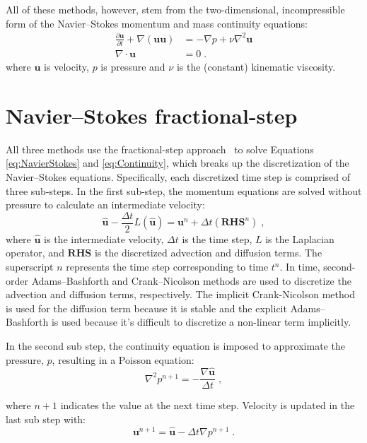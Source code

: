 All of these methods, however, stem from the two-dimensional, incompressible form of the Navier--Stokes momentum and mass continuity equations:
\begin{align}
\frac{\partial \textbf{u}}{\partial t} + \nabla ( \textbf{uu} ) &= -\nabla p + \nu\nabla^{2}\textbf{u} \label{eq:NavierStokes} \\
\nabla \cdot \textbf{u} &= 0 \label{eq:Continuity} \;.
\end{align}
where $\textbf{u}$ is velocity, $p$ is pressure and $\nu$ is the (constant) kinematic viscosity.

\section{Navier--Stokes fractional-step}\label{NM:NavierStokes}
All three methods use the fractional-step approach~\cite{Perot1993} to solve Equations \eqref{eq:NavierStokes} and \eqref{eq:Continuity}, which breaks up the discretization of the Navier--Stokes equations. 
Specifically, each discretized time step is comprised of three sub-steps.
In the first sub-step, the momentum equations are solved without pressure to  calculate an intermediate velocity:
\begin{equation}\label{eq:Intermediate Velocity}
\hat{\textbf{u}} - \frac{\Delta t}{2}L(\hat{\textbf{u}}) = \textbf{u}^n + \Delta t(\textbf{RHS}^n) \;,
\end{equation}
where $\hat{\textbf{u}}$ is the intermediate velocity, $\Delta t$ is the time step, $L$ is the Laplacian operator, and $\textbf{RHS}$ is the discretized advection and diffusion terms. 
The superscript $n$ represents the time step corresponding to time $t^n$. 
In time, second-order Adams--Bashforth and Crank--Nicolson methods are used to discretize the advection and diffusion terms, respectively. 
The implicit Crank-Nicolson method is used for the diffusion term because it is stable and the explicit Adams--Bashforth is used because it's difficult to discretize a non-linear term implicitly. 

In the second sub step, the continuity equation is imposed to approximate the pressure, $p$, resulting in a Poisson equation:
\begin{equation}\label{eq:Poisson}
\nabla^2p^{n+1} = - \frac{\nabla\hat{\textbf{u}}}{\Delta t} \;,
\end{equation}

where $n+1$ indicates the value at the next time step. Velocity is updated in the last sub step with:
\begin{equation}\label{eq:Projection}
\textbf{u}^{n+1} = \hat{\textbf{u}} - \Delta t\nabla p^{n+1} \;.
\end{equation}

